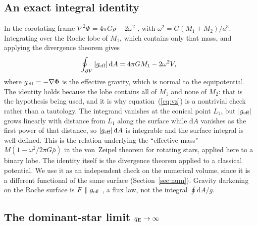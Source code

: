 \documentclass[twocolumn]{aastex702}
\newcommand{\qE}{q_{\rm E}}
\newcommand{\dd}{\mathrm{d}}
\newcommand{\geff}{g_{\rm eff}}
\begin{document}
\subsection{An exact integral identity}\label{sec:vonzeipel}

In the corotating frame $\nabla^2\Phi=4\pi G\rho-2\omega^2$ \citep{vonZeipel1924}, with $\omega^2=G(M_1+M_2)/a^3$. Integrating over the Roche lobe of $M_1$, which contains only that mass, and applying the divergence theorem gives
\begin{equation}
\oint_{\partial V}|\geff|\,\dd A=4\pi GM_1-2\omega^2V,
\label{eq:vz}
\end{equation}
where $\geff=-\nabla\Phi$ is the effective gravity, which is normal to the equipotential. The identity holds because the lobe contains all of $M_1$ and none of $M_2$: that is the hypothesis being used, and it is why equation~(\ref{eq:vz}) is a nontrivial check rather than a tautology. The integrand vanishes at the conical point $L_1$, but $|\geff|$ grows linearly with distance from $L_1$ along the surface while $\dd A$ vanishes as the first power of that distance, so $|\geff|\,\dd A$ is integrable and the surface integral is well defined. This is the relation underlying the ``effective mass'' $M(1-\omega^2/2\pi G\bar\rho)$ in the von~Zeipel theorem for rotating stars, applied here to a binary lobe. The identity itself is the divergence theorem applied to a classical potential. We use it as an independent check on the numerical volume, since it is a different functional of the same surface (Section~\ref{sec:num}). Gravity darkening on the Roche surface is $F\parallel\geff$ \citep{EspinosaLara2011}, a flux law, not the integral $\oint\mathrm{d}A/g$.

\subsection{The dominant-star limit $\qE\to\infty$}\label{sec:limit_inf}
\end{document}
